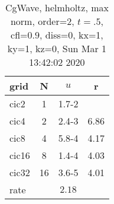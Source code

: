 \begin{table}[H]\tableFont %
\begin{center}
\begin{tabular}{|l|c|c|c|} \hline 
grid  & N &  $ u $ & r \\ \hline 
      cic2 &     1 & \num{1.7}{-2} &       \\ \hline
      cic4 &     2 & \num{2.4}{-3} &  6.86  \\ \hline
      cic8 &     4 & \num{5.8}{-4} &  4.17  \\ \hline
     cic16 &     8 & \num{1.4}{-4} &  4.03  \\ \hline
     cic32 &    16 & \num{3.6}{-5} &  4.01  \\ \hline
    rate             &       &  $2.18$       &       \\ \hline
\end{tabular}
\caption{CgWave, helmholtz, max norm, order=$2$, $t=.5$, cfl=$0.9$, diss=$0$, kx=1, ky=1, kz=0, Sun Mar  1 13:42:02 2020}\label{table:helmholtzOrder2max}
\end{center}
\end{table}
